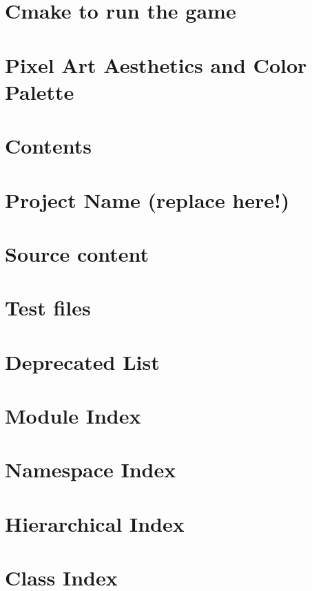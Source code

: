 \let\mypdfximage\pdfximage\def\pdfximage{\immediate\mypdfximage}\documentclass[twoside]{book}
\newcommand{\+}{\discretionary{\mbox{\scriptsize$\hookleftarrow$}}{}{}}
\begin{document}
\chapter{Cmake to run the game}
\label{md_meeting_notes_plan_gameflow}

\chapter{Pixel Art Aesthetics and Color Palette}
\label{md_meeting_notes_plan_gui_plan}

\chapter{Contents}
\label{md_meeting_notes_plan_readme}

\chapter{Project Name (replace here!)}
\label{md_README}

\chapter{Source content}
\label{md_src_readme}

\chapter{Test files}
\label{md_tests_readme}

\chapter{Deprecated List}
\label{deprecated}

\chapter{Module Index}

\chapter{Namespace Index}

\chapter{Hierarchical Index}

\chapter{Class Index}

\end{document}
